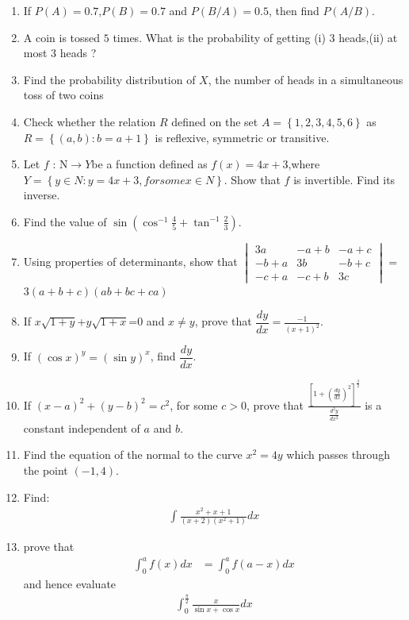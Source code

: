\documentclass[12pt,-letter paper]{article}
\providecommand{\sbrak}[1]{\ensuremath{{}\left[#1\right]}}
\providecommand{\brak}[1]{\ensuremath{\left(#1\right)}}
\providecommand{\cbrak}[1]{\ensuremath{\left\{#1\right\}}}
\theoremstyle{remark}
\newcommand{\mydet}[1]{\ensuremath{\begin{vmatrix}#1\end{vmatrix}}}
\begin{document}
\begin{enumerate}
\item If $P(A) =0.7$,$P(B)=0.7$ and $P(B/A)=0.5$, then find $P(A/B)$.

\item A coin is tossed $5$ times. What is the probability of getting (i) $3$ heads,(ii) at most $3$ heads ?

\item Find the probability distribution of $X$, the number of heads in a simultaneous toss of two coins

\item Check whether the relation $R$ defined on the set $A=\cbrak{1,2,3,4,5,6}$ as $R =\cbrak {(a, b) : b = a + 1}$ is reflexive, symmetric or transitive.

\item Let $f$ : N$\rightarrow Y $be a function defined as $f\brak{x}= 4x + 3$,where $Y=\cbrak{y\in N:y=4x+3,for some x\in N}$. Show that $f$ is invertible. Find its inverse.

\item Find the value of $\sin\brak{\cos^{-1}{\frac{4}{5}}+{\tan^{-1}{\frac{2}{3}}}}$.
\item Using properties of determinants, show that \mydet{3a & -a+b & -a+c \\ -b+a & 3b & -b+c \\ -c+a & -c+b & 3c} = 3\brak{a+b+c}\brak{ab+bc+ca}

\item If $x\sqrt{1+y}$+$y\sqrt{1+x}$=0 and $x\neq y$, prove that $\dfrac{dy}{dx} = \frac{-1}{\brak{x+1}^2}$.

\item If $\brak{\cos x}^y = \brak{\sin y }^x$, find $\dfrac{dy}{dx}$.

\item If $\brak{x-a}^2+\brak{y-b}^2={c}^2$, for some $c>0$, prove that
$\frac{\sbrak{1+\brak{\frac{dy}{dx}}^2}^\frac{3}{2}}{\frac{d^2y}{dx^2}}$ is a constant independent of $a$ and $b$.

\item Find the equation of the normal to the curve ${x}^2 = 4y$ which passes through the point $\brak{-1,4}$.

\item Find: \begin{align*}\int{\frac{x^2+x+1}{\brak{x+2}\brak{x^2+1}}}dx\end{align*}

\item prove that \begin{align*}
    \int_{0}^{a} f\brak{x}dx &= \int_{0}^{a} f\brak{a-x}dx
\end{align*}
and hence evaluate \begin{align*}\int_{0}^{\frac{\pi}{2}}\frac{x}{{\sin x}+{\cos x}}dx\end{align*}


\end{enumerate}
\end{document}
